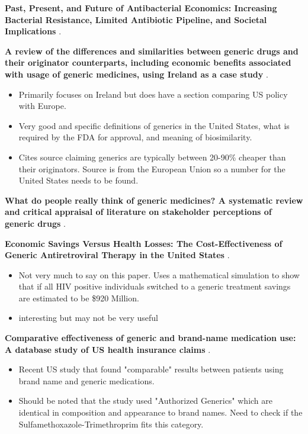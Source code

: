 \noindent\textbf{Past, Present, and Future of Antibacterial Economics: Increasing Bacterial Resistance, Limited Antibiotic Pipeline, and Societal Implications} \cite{luepke_past_2017}.\\
\begin{itemize}

\end{itemize}

\noindent\textbf{A review of the differences and similarities between generic drugs and their originator counterparts, including economic benefits associated with usage of generic medicines, using Ireland as a case study} \cite{dunne_review_2013}.\\
\begin{itemize}
    \item Primarily focuses on Ireland but does have a section comparing US policy with Europe.
    \item Very good and specific definitions of generics in the United States, what is required by the FDA for approval, and meaning of biosimilarity.
    \item Cites source claiming generics are typically between 20-90\% cheaper than their originators. Source is from the European Union so a number for the United States needs to be found. 
\end{itemize}

\noindent\textbf{What do people really think of generic medicines? {A} systematic review and critical appraisal of literature on stakeholder perceptions of generic drugs} \cite{dunne_what_2015}.\\
\begin{itemize}

\end{itemize}

\noindent\textbf{Economic Savings Versus Health Losses: The Cost-Effectiveness of Generic Antiretroviral Therapy in the United States} \cite{walensky_economic_2013}.\\
\begin{itemize}
    \item Not very much to say on this paper. Uses a mathematical simulation to show that if all HIV positive individuals switched to a generic treatment savings are estimated to be \$920 Million.
    \item interesting but may not be very useful
\end{itemize}

\noindent\textbf{Comparative effectiveness of generic and brand-name medication use: A database study of US health insurance claims} \cite{desai_comparative_2019}.\\
\begin{itemize}
    \item Recent US study that found "comparable" results between patients using brand name and generic medications.
    \item Should be noted that the study used "Authorized Generics" which are identical in composition and appearance to brand names. Need to check if the Sulfamethoxazole-Trimethroprim fits this category.
\end{itemize}

\newpage

 



